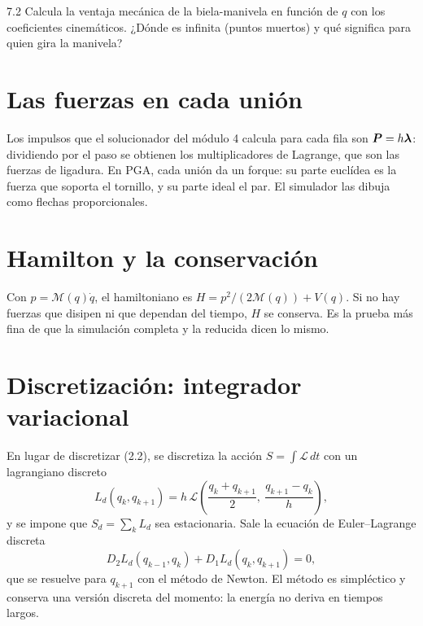 \documentclass[11pt,a4paper]{article}
\begin{document}
\begin{ejercicio}{7.2}
Calcula la ventaja mecánica de la biela-manivela en función de $q$ con los coeficientes cinemáticos. ¿Dónde es
infinita (puntos muertos) y qué significa para quien gira la manivela?
\end{ejercicio}

\section{Las fuerzas en cada unión}

Los impulsos que el solucionador del módulo 4 calcula para cada fila son $\bm{P} = h\bm{\lambda}$: dividiendo por el
paso se obtienen los multiplicadores de Lagrange, que son las fuerzas de ligadura. En PGA, cada unión da un forque: su
parte euclídea es la fuerza que soporta el tornillo, y su parte ideal el par. El simulador las dibuja como flechas
proporcionales.

\section{Hamilton y la conservación}

Con $p = \mathcal M(q)\dot q$, el hamiltoniano es $H = p^2/(2\mathcal M(q)) + V(q)$. Si no hay fuerzas que disipen ni
que dependan del tiempo, $H$ se conserva. Es la prueba más fina de que la simulación completa y la reducida dicen lo
mismo.

\section{Discretización: integrador variacional}

En lugar de discretizar (2.2), se discretiza la acción $S = \int\mathcal L\,dt$ con un lagrangiano discreto
\begin{equation}
  L_d(q_k, q_{k+1}) = h\,\mathcal L\!\left(\frac{q_k + q_{k+1}}{2},\ \frac{q_{k+1}-q_k}{h}\right),
\end{equation}
y se impone que $S_d = \sum_k L_d$ sea estacionaria. Sale la ecuación de Euler–Lagrange discreta
\begin{equation}
  D_2L_d(q_{k-1}, q_k) + D_1L_d(q_k, q_{k+1}) = 0,
\end{equation}
que se resuelve para $q_{k+1}$ con el método de Newton. El método es simpléctico y conserva una versión discreta del
momento: la energía no deriva en tiempos largos.
\end{document}
